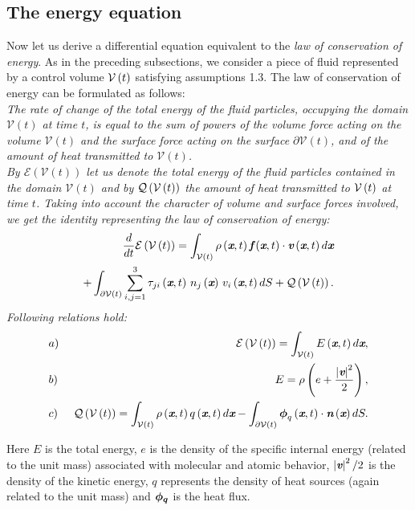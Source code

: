 \subsection{The energy equation}
Now let us derive a differential equation equivalent to the \textit{law of conservation of energy}. As in the preceding subsections, we consider a piece of fluid represented by a control volume $\mathcal{V}\left({t}\right) $ satisfying assumptions 1.3. The law of conservation of energy can be formulated as follows:
\itshape
\\
\hspace*{3mm}
The rate of change of the total energy of the fluid particles, occupying the domain $\mathcal{V}\left(t\right)$ at time $t$, is equal to the sum of powers of the volume force acting on the volume $\mathcal{V}\left(t\right)$ and the surface force acting on the surface $\partial\mathcal{V}\left(t\right)$, and of the amount of heat transmitted to $\mathcal{V}\left(t\right)$.\\
\upshape
By $\mathcal{E}\left(\mathcal{V}\left(t\right)\right)$ let us denote the total energy of the fluid particles contained in the domain $\mathcal{V}\left(t\right)$ and by 
$\mathcal{Q}\left({}\mathcal{V}\left({t}\right)\right) $ the amount of heat transmitted to $\mathcal{V}\left({t}\right) $ at time $t$. Taking into account the character of volume and surface forces involved, we get the identity representing the law of conservation of energy:
\begin{eqnarray}\label{energy}
 \frac{d}{dt}\mathcal{E}\left({}\mathcal{V}\left({t}\right)\right) = \int_{\mathcal{V}\left({t}\right)}\rho\left({}\textit{\textbf{x}},t\right)\textit{\textbf{f}}\left({}\textit{\textbf{x}},t\right)\cdot\textit{\textbf{v}}\left({}\textit{\textbf{x}},t\right){d}\textit{\textbf{x}} \\ \nonumber
+ \int_{\partial\mathcal{V}\left({t}\right)}
\sum_{i,j=1}^3\tau_{ji}\left({}\textit{\textbf{x}},t\right)\,n_j\left({}\textit{\textbf{x}}\right)\,v_i\left({}\textit{\textbf{x}},t\right)
{dS} + 
\mathcal{Q}\left({}\mathcal{V}\left({t}\right)\right).
\end{eqnarray}
Following relations hold:
\begin{eqnarray}
  \label{energy_rel}& a) &\ \mathcal{E}\left({}\mathcal{V}\left({t}\right)\right) = \int_{\mathcal{V}\left({t}\right)}E\left({}\textit{\textbf{x}},t\right){d}\textit{\textbf{x}},\\
  & b) &\  E = \rho\left({}e+\frac{\left|\textit{\textbf{v}}\right|^2}{2}\right) \nonumber,\\ \nonumber
  & c) &\  \mathcal{Q}\left({}\mathcal{V}\left({t}\right)\right)=\int_{\mathcal{V}\left({t}\right)}\rho\left({}\textit{\textbf{x}},t\right){q}\left({}\textit{\textbf{x}},t\right){d}\textit{\textbf{x}} - \int_{\partial\mathcal{V}\left({t}\right)}\boldsymbol{\phi}_q\left({}\textit{\textbf{x}},t\right)\cdot\textit{\textbf{n}}\left({}\textit{\textbf{x}}\right){d}S.
\end{eqnarray}

Here $E$ is the total energy, $e$ is the density of the specific internal energy (related to the unit mass) associated with molecular and atomic behavior, $\left|\textit{\textbf{v}}\right|^2/2$ is the density of the kinetic energy, $q$ represents the density of heat sources (again related to the unit mass) and $\boldsymbol{\phi_{q}}$ is the heat flux.
